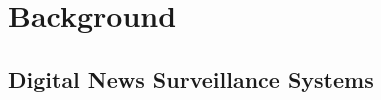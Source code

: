 \documentclass{l4proj}
\begin{document}

\chapter{Background}
\section{Digital News Surveillance Systems}
\end{document}
